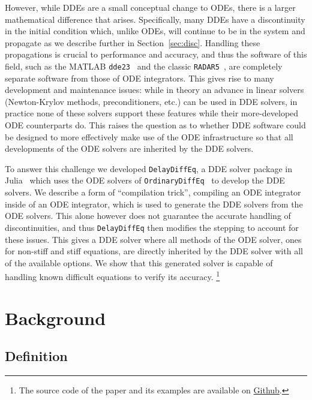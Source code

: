 \documentclass{juliacon}
\def\pkg#1{\texttt{#1}}
\begin{document}
However, while DDEs are a small conceptual change to ODEs, there is a larger
mathematical difference that arises. Specifically, many DDEs have a discontinuity
in the initial condition which, unlike ODEs, will continue to be in the system and
propagate as we describe further in Section~\ref{sec:disc}. Handling these propagations
is crucial to performance and accuracy, and thus the software of this field, such as the
MATLAB \pkg{dde23}~\cite{shampine01_solving_ddes_matlab} and the classic \pkg{RADAR5}~\cite{guglielmi01_implementing_radau}, are completely separate software from those of
ODE integrators. This gives rise to many development and maintenance issues: while in
theory an advance in linear solvers (Newton-Krylov methods, preconditioners, etc.) can
be used in DDE solvers, in practice none of these solvers support these features while
their more-developed ODE counterparts do. This raises the question as to whether DDE
software could be designed to more effectively make use of the ODE infrastructure so that
all developments of the ODE solvers are inherited by the DDE solvers.

To answer this challenge we developed \pkg{DelayDiffEq}, a DDE solver package in Julia~\cite{bezanson2017julia} which uses the ODE solvers of \pkg{OrdinaryDiffEq}~\cite{DifferentialEquations.jl-2017} to develop the DDE solvers. We describe a form
of ``compilation trick'', compiling an ODE integrator inside of an ODE integrator,
which is used to generate the DDE solvers from the ODE solvers. This alone however does
not guarantee the accurate handling of discontinuities, and thus \pkg{DelayDiffEq} then modifies
the stepping to account for these issues. This gives a DDE solver where all methods of the
ODE solver, ones for non-stiff and stiff equations, are directly inherited by the DDE solver
with all of the available options. We show that this generated solver is capable of handling 
known difficult equations to verify its accuracy.%
\footnote{The source code of the paper and its examples are available on \href{https://github.com/SciML/DelayDiffEq.jl/tree/paper}{Github}.}

\section{Background}

\subsection{Definition}
\end{document}
